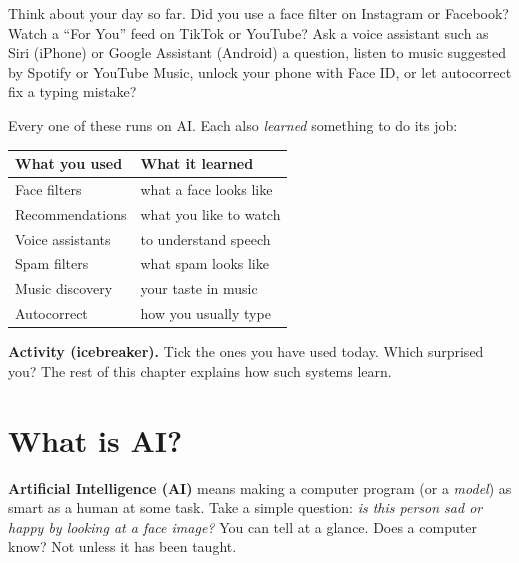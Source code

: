 Think about your day so far. Did you use a face filter on Instagram or Facebook? Watch a “For You” feed on TikTok or YouTube? Ask a voice assistant such as Siri (iPhone) or Google Assistant (Android) a question, listen to music suggested by Spotify or YouTube Music, unlock your phone with Face ID, or let autocorrect fix a typing mistake?


Every one of these runs on AI. Each also \emph{learned} something to do its job:


\begin{center}



\renewcommand{\arraystretch}{1.15}

\begin{tabularx}{\linewidth}{>{\raggedright\arraybackslash}X>{\raggedright\arraybackslash}X}

\toprule

\textbf{What you used} & \textbf{What it learned} \\

\midrule

Face filters & what a face looks like \\

Recommendations & what you like to watch \\

Voice assistants & to understand speech \\

Spam filters & what spam looks like \\

Music discovery & your taste in music \\

Autocorrect & how you usually type \\

\bottomrule

\end{tabularx}

\end{center}

\textbf{Activity (icebreaker).} Tick the ones you have used today. Which surprised you? The rest of this chapter explains how such systems learn.


\section{What is AI?}

\textbf{Artificial Intelligence (AI)} means making a computer program (or a \emph{model}) as smart as a human at some task. Take a simple question: \emph{is this person sad or happy by looking at a face image?} You can tell at a glance. Does a computer know? Not unless it has been taught.


